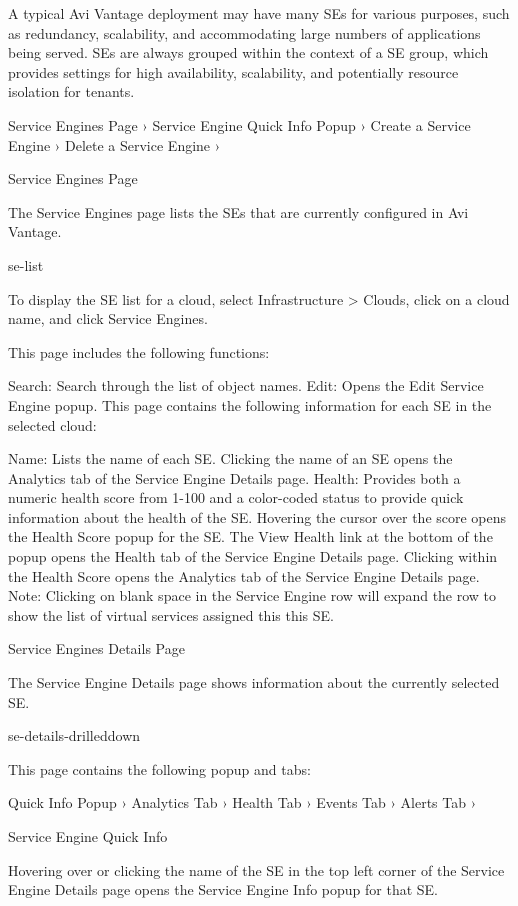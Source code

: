 \documentclass[letterpaper,10pt,english]{sphinxmanual}
\begin{document}
A typical Avi Vantage deployment may have many SEs for various purposes, such as redundancy, scalability, and accommodating large numbers of applications being served. SEs are always grouped within the context of a SE group, which provides settings for high availability, scalability, and potentially resource isolation for tenants.

Service Engines Page ›
Service Engine Quick Info Popup ›
Create a Service Engine ›
Delete a Service Engine ›

Service Engines Page

The Service Engines page lists the SEs that are currently configured in Avi Vantage.

se-list

To display the SE list for a cloud, select Infrastructure \textgreater{} Clouds, click on a cloud name, and click Service Engines.

This page includes the following functions:

Search: Search through the list of object names.
Edit: Opens the Edit Service Engine popup.
This page contains the following information for each SE in the selected cloud:

Name: Lists the name of each SE. Clicking the name of an SE opens the Analytics tab of the Service Engine Details page.
Health: Provides both a numeric health score from 1-100 and a color-coded status to provide quick information about the health of the SE.
Hovering the cursor over the score opens the Health Score popup for the SE.
The View Health link at the bottom of the popup opens the Health tab of the Service Engine Details page.
Clicking within the Health Score opens the Analytics tab of the Service Engine Details page.
Note: Clicking on blank space in the Service Engine row will expand the row to show the list of virtual services assigned this this SE.

Service Engines Details Page

The Service Engine Details page shows information about the currently selected SE.

se-details-drilleddown

This page contains the following popup and tabs:

Quick Info Popup ›
Analytics Tab ›
Health Tab ›
Events Tab ›
Alerts Tab ›

Service Engine Quick Info

Hovering over or clicking the name of the SE in the top left corner of the Service Engine Details page opens the Service Engine Info popup for that SE.
\end{document}
